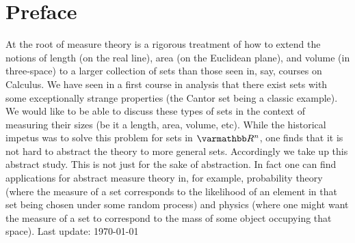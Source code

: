 \documentclass[11pt,oneside,openany]{memoir}
\begin{document}
    \chapter*{Preface}
    At the root of measure theory is a rigorous treatment of how to extend the notions of length (on the real line), area (on the Euclidean plane), and volume (in three-space) to a larger collection of sets than those seen in, say, courses on Calculus. We have seen in a first course in analysis that there exist sets with some exceptionally strange properties (the Cantor set being a classic example). We would like to be able to discuss these types of sets in the context of measuring their sizes (be it a length, area, volume, etc). While the historical impetus was to solve this problem for sets in $\bfR^n$, one finds that it is not hard to abstract the theory to more general sets. Accordingly we take up this abstract study. This is not just for the sake of abstraction. In fact one can find applications for abstract measure theory in, for example, probability theory (where the measure of a set corresponds to the likelihood of an element in that set being chosen under some random process) and physics (where one might want the measure of a set to correspond to the mass of some object occupying that space). 
    \vspace{-25pt}
    \tableofcontents
    \vfill
    \specialdate
    Last update: \today

    
    
    
\end{document}
